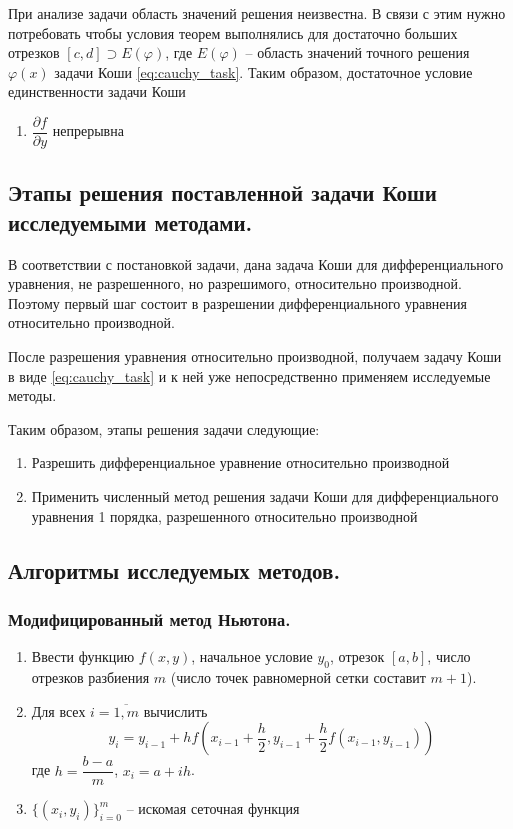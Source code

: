 \documentclass[a4paper, 12pt]{article}
\theoremstyle{mythm}
\begin{document}
	При анализе задачи область значений решения неизвестна. В связи с этим нужно потребовать чтобы условия теорем выполнялись для достаточно больших отрезков $[c,d] \supset E(\varphi)$, где $E(\varphi)$ -- область значений точного решения $\varphi(x)$ задачи Коши \eqref{eq:cauchy_task}. Таким образом, достаточное условие единственности задачи Коши
	\begin{enumerate}
		\item $\dfrac{\partial f}{\partial y}$ непрерывна
	\end{enumerate}
	
	\subsection{Этапы решения поставленной задачи Коши исследуемыми методами.}
	
	В соответствии с постановкой задачи, дана задача Коши для дифференциального уравнения, не разрешенного, но разрешимого, относительно производной. Поэтому первый шаг состоит в разрешении дифференциального уравнения относительно производной.
	
	После разрешения уравнения относительно производной, получаем задачу Коши в виде \eqref{eq:cauchy_task} и к ней уже непосредственно применяем исследуемые методы. 
	
	Таким образом, этапы решения задачи следующие:
	\begin{enumerate}
		\item Разрешить дифференциальное уравнение относительно производной
		\item Применить численный метод решения задачи Коши для дифференциального уравнения 1 порядка, разрешенного относительно производной
	\end{enumerate}
	
	\subsection{Алгоритмы исследуемых методов.}
	
	\subsubsection{Модифицированный метод Ньютона.}
	
	\begin{enumerate}
		\item Ввести функцию $f(x,y)$, начальное условие $y_0$, отрезок $[a,b]$, число отрезков разбиения $m$ (число точек равномерной сетки составит $m+1$).
		\item Для всех $i=\overline{1,m}$ вычислить
		\begin{equation} \label{euler_method}
			y_i = y_{i-1} + hf(x_{i-1} + \frac{h}{2}, y_{i-1}+\frac{h}{2}f(x_{i-1},y_{i-1}))
		\end{equation}
		где $h=\dfrac{b-a}{m}$, $x_i=a+ih$.
		\item $\{(x_i,y_i)\}_{i=0}^m$ -- искомая сеточная функция
	\end{enumerate}
\end{document}
